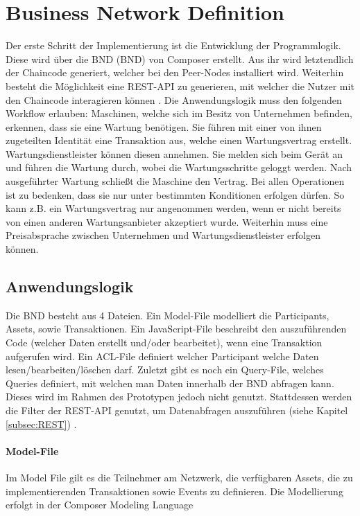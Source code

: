 \section{Business Network Definition}
Der erste Schritt der Implementierung ist die Entwicklung der Programmlogik. Diese wird über die \acl{BND} (\acs{BND}) von Composer erstellt. Aus ihr wird letztendlich der Chaincode generiert, welcher bei den Peer-Nodes installiert wird. Weiterhin besteht die Möglichkeit eine REST-API zu generieren, mit welcher die Nutzer mit den Chaincode interagieren können \cite{HyperledgerComposerTeamDeveloperTutorialHyperledger}. Die Anwendungslogik muss den folgenden Workflow erlauben: Maschinen, welche sich im Besitz von Unternehmen befinden, erkennen, dass sie eine Wartung benötigen. Sie führen mit einer von ihnen zugeteilten Identität eine Transaktion aus, welche einen Wartungsvertrag erstellt. Wartungsdienstleister können diesen annehmen. Sie melden sich beim Gerät an und führen die Wartung durch, wobei die Wartungsschritte geloggt werden. Nach ausgeführter Wartung schließt die Maschine den Vertrag. Bei allen Operationen ist zu bedenken, dass sie nur unter bestimmten Konditionen erfolgen dürfen. So kann z.B. ein Wartungsvertrag nur angenommen werden, wenn er nicht bereits von einen anderen Wartungsanbieter akzeptiert wurde. Weiterhin muss eine Preisabsprache zwischen Unternehmen und Wartungsdienstleister erfolgen können. 

\subsection{Anwendungslogik}
Die \acs{BND} besteht aus 4 Dateien. Ein Model-File modelliert die Participants, Assets, sowie Transaktionen. Ein JavaScript-File beschreibt den auszuführenden Code (welcher Daten erstellt und/oder bearbeitet), wenn eine Transaktion aufgerufen wird. Ein ACL-File definiert welcher Participant welche Daten lesen/bearbeiten/löschen darf. Zuletzt gibt es noch ein Query-File, welches Queries definiert, mit welchen man Daten innerhalb der \acs{BND} abfragen kann. Dieses wird im Rahmen des Prototypen jedoch nicht genutzt. Stattdessen werden die Filter der REST-API genutzt, um Datenabfragen auszuführen (siehe Kapitel \ref{subsec:REST}) \cite{HyperledgerComposerTeamIntroductionHyperledgerComposer}.

\paragraph{Model-File}
Im Model File gilt es die Teilnehmer am Netzwerk, die verfügbaren Assets, die zu implementierenden Transaktionen sowie Events zu definieren. Die Modellierung erfolgt in der Composer Modeling Language \cite{HyperledgerComposerTeamModelingLanguageHyperledger}

